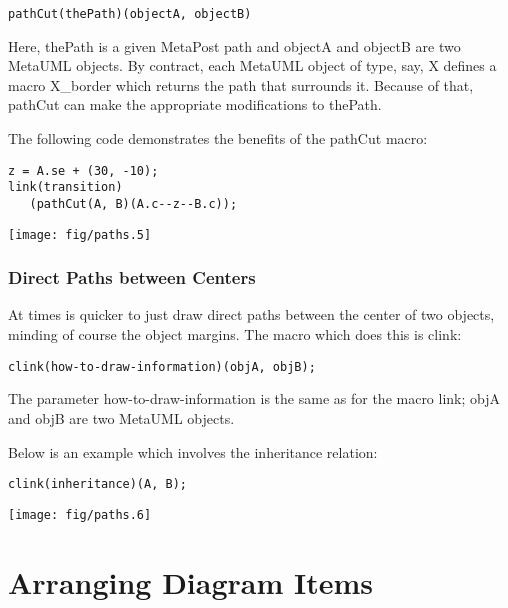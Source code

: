 \documentclass{article}
\newcommand{\code}{\ttfamily}
\begin{document}
\begin{verbatim}
pathCut(thePath)(objectA, objectB)
\end{verbatim}

Here, {\code thePath} is a given MetaPost path and {\code objectA} and {\code objectB}
are two MetaUML objects. By contract, each MetaUML object of type, say, {\code X}
defines a macro {\code X\_border} which returns the path that surrounds it. Because
of that, {\code pathCut} can make the appropriate modifications to {\code thePath}.

The following code demonstrates the benefits of the {\code pathCut} macro:

\begin{multicols}{2}
\begin{verbatim}
z = A.se + (30, -10);
link(transition)
   (pathCut(A, B)(A.c--z--B.c));
\end{verbatim}
\columnbreak
\hspace{1cm}\texttt{[image: fig/paths.5]}
\end{multicols}

\subsubsection{Direct Paths between Centers}

At times is quicker to just draw direct paths between the center of two objects,
minding of course the object margins. The macro which does this is {\code clink}:

\begin{verbatim}
clink(how-to-draw-information)(objA, objB);
\end{verbatim}

The parameter {\code how-to-draw-information} is the same as for the macro {\code link};
{\code objA} and {\code objB} are two MetaUML objects.

Below is an example which involves the inheritance relation:

\begin{multicols}{2}
\begin{verbatim}
clink(inheritance)(A, B);
\end{verbatim}
\columnbreak
\hspace{1cm}\texttt{[image: fig/paths.6]}
\end{multicols}

\section{Arranging Diagram Items}
\label{section:positioning}
\end{document}
